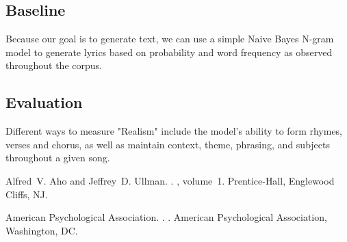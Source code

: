 \documentclass[11pt]{article}
\begin{document}
\subsection{Baseline} %
Because our goal is to generate text, we can use a simple Naive Bayes N-gram model to generate lyrics based on probability and word frequency as observed throughout the corpus.
\subsection{Evaluation} %
Different ways to measure "Realism" include the model's ability to form rhymes, verses and chorus, as well as maintain context, theme, phrasing, and subjects throughout a given song.


%
%

\begin{thebibliography}{}

Alfred~V. Aho and Jeffrey~D. Ullman.
.
, volume~1.
\newblock Prentice-{Hall}, Englewood Cliffs, NJ.

{American Psychological Association}.
.
.
\newblock American Psychological Association, Washington, DC.



\end{thebibliography}
\end{document}
